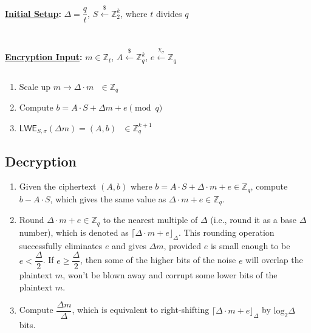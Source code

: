 \begin{tcolorbox}[title={\textbf{\tboxlabel{\ref*{subsec:lwe-enc}} LWE Encryption}}]
\textbf{\underline{Initial Setup}:} $\Delta = \dfrac{q}{t}$, $S \xleftarrow{\$} \mathbb{Z}_2^k$, where $t$ divides $q$

$ $

$ $

\textbf{\underline{Encryption Input}:} $m \in \mathbb{Z}_t$, $A \xleftarrow{\$} \mathbb{Z}_q^k$, $e \xleftarrow{\chi_\sigma} \mathbb{Z}_q$

$ $


\begin{enumerate}
\item Scale up $m \longrightarrow \Delta \cdot m \text{ } \in \mathbb{Z}_q$

\item Compute $b = {A} \cdot {S} + \Delta  m + e \pmod q$
\item $\textsf{LWE}_{S,\sigma}(\Delta  m) = ({A}, b) \text{ } \in \mathbb{Z}_q^{k + 1}$ 
\end{enumerate}

\end{tcolorbox}

\subsection{Decryption}
\label{subsec:lwe-dec} 

\begin{enumerate}
\item Given the ciphertext $({A}, b)$ where $b = {A} \cdot {S} + \Delta \cdot m + e \in \mathbb{Z}_q$, compute $b - {A} \cdot {S}$, which gives the same value as $\Delta \cdot m + e \in \mathbb{Z}_q$. 
\item Round $\Delta \cdot m + e \in \mathbb{Z}_q$ to the nearest multiple of $\Delta$ (i.e., round it as a base $\Delta$ number), which is denoted as $\lceil \Delta \cdot m + e \rfloor_{\Delta}$. This rounding operation successfully eliminates $e$ and gives $\Delta m$, provided $e$ is small enough to be $e < \dfrac{\Delta}{2}$. If $e \geq \dfrac{\Delta}{2}$, then some of the higher bits of the noise $e$ will overlap the plaintext $m$, won't be blown away and corrupt some lower bits of the plaintext $m$.
\item Compute $\dfrac{\Delta m} {\Delta}$, which is equivalent to right-shifting $\lceil \Delta \cdot m + e \rfloor_{\Delta}$ by $\text{log}_2 \Delta$ bits. 
\end{enumerate}

